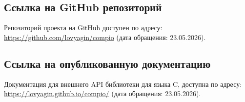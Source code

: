 
\subsection*{Ссылка на GitHub репозиторий} \label{compio_repo}
Репозиторий проекта на GitHub доступен по адресу: \href{https://github.com/lovyagin/compio}{https://github.com/lovyagin/compio} (дата обращения: 23.05.2026).

\subsection*{Ссылка на опубликованную документацию} \label{compio_docs}
Документация для внешнего API библиотеки для языка C, доступна по адресу: \href{https://lovyagin.github.io/compio/}{https://lovyagin.github.io/compio/} (дата обращения: 23.05.2026).